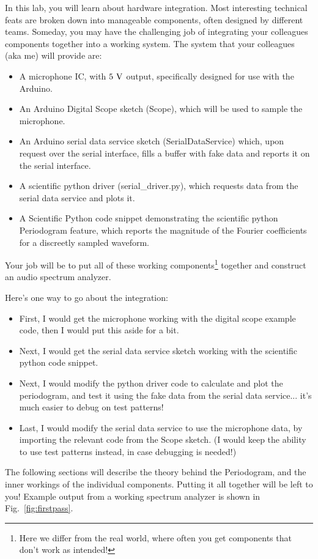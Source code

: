 \documentclass[12pt]{article}
\begin{document}
In this lab, you will learn about hardware integration.  Most interesting technical feats are broken down into manageable components, often designed by different teams.  Someday, you may have the challenging job of integrating your colleagues components together into a working system.   The system that your colleagues (aka me) will provide are:
\begin{itemize}
\item A microphone IC, with $5~\rm V$ output, specifically designed for use with the Arduino.
\item An Arduino Digital Scope sketch (Scope), which will be used to sample the microphone.
\item An Arduino serial data service sketch (SerialDataService) which, upon request over the serial interface, fills a buffer with fake data and reports it on the serial interface.
\item A scientific python driver (serial\_driver.py), which requests data from the serial data service and plots it.
\item A Scientific Python code snippet demonstrating the scientific python Periodogram feature, which reports the magnitude of the Fourier coefficients for a discreetly sampled waveform.
\end{itemize}
Your job will be to put all of these working components\footnote{Here we differ from the real world, where often you get components that don't work as intended!} together and construct an audio spectrum analyzer. 

Here's one way to go about the integration:  
\begin{itemize}
\item First, I would get the microphone working with the digital scope example code, then I would put this aside for a bit.
\item Next, I would get the serial data service sketch working with the scientific python code snippet.
\item Next, I would modify the python driver code to calculate and plot the periodogram, and test it using the fake data from the serial data service... it's much easier to debug on test patterns!
\item Last, I would modify the serial data service to use the microphone data, by importing the relevant code from the Scope sketch.  (I would keep the ability to use test patterns instead, in case debugging is needed!)
\end{itemize}
The following sections will describe the theory behind the Periodogram, and the inner workings of the individual components.  Putting it all together will be left to you!  Example output from a working spectrum analyzer is shown in Fig.~\ref{fig:firstpass}.
\end{document}
